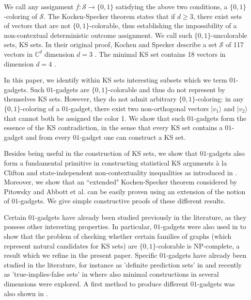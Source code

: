 \documentclass[twocolumn, a4paper, superscriptaddress,nofootinbib, accepted=2020-08-07, hyperref]{quantumarticle}
\begin{document}
We call any assignment $f : \mathcal{S} \rightarrow \{0,1\}$ satisfying the above two conditions, a $\{0,1\}$-coloring of $\mathcal{S}$. The Kocken-Specker theorem states that if $d\geq 3$, there exist sets of vectors that are not $\{0,1\}$-colorable, thus establishing the impossibility of a non-contextual deterministic outcome assignment. We call such $\{0,1\}$-uncolorable sets, KS sets. In their original proof, Kochen and Specker describe a set $\mathcal{S}$ of 117 vectors in $\mathbb{C}^d$ dimension $d=3$ \cite{KS}. The minimal KS set contains 18 vectors in dimension $d=4$ \cite{CEG96, Cab08}. 	


In this paper, we identify within KS sets interesting subsets which we term $01$-gadgets. Such $01$-gadgets are $\{0,1\}$-colorable and thus do not represent by themselves KS sets. However, they do not admit arbitrary $\{0,1\}$-coloring: in any $\{0,1\}$-coloring of a $01$-gadget, there exist two non-orthogonal vectors $|v_1\rangle$ and $|v_2\rangle$ that cannot both be assigned the color 1. We show that such $01$-gadgets form the essence of the KS contradiction, in the sense that every KS set contains a $01$-gadget and from every $01$-gadget one can construct a KS set.

Besides being useful in the construction of KS sets, we show that $01$-gadgets also form a fundamental primitive in constructing statistical KS arguments \`a la Clifton \cite{Clifton93} and state-independent non-contextuality inequalities as introduced in \cite{YO12}. Moreover, we show that an ``extended" Kochen-Specker theorem considered by Pitowsky \cite{Pitowsky} and Abbott et al. \cite{ACS15, ACCS12} can be easily proven using an extension of the notion of $01$-gadgets. We give simple constructive proofs of these different results. 

Certain $01$-gadgets have already been studied previously in the literature, as they possess other interesting properties. In particular, $01$-gadgets were also used in \cite{Arends09} to show that the problem of checking whether certain families of graphs (which represent natural candidates for KS sets) are $\{0,1\}$-colorable is NP-complete, a result which we refine in the present paper. Specific $01$-gadgets have already been studied in the literature, for instance as 'definite prediction sets' in \cite{CA96} and recently as 'true-implies-false sets' in \cite{APSS18} where also minimal constructions in several dimensions were explored. A first method to produce different $01$-gadgets was also shown in \cite{CG95}. 
\end{document}
